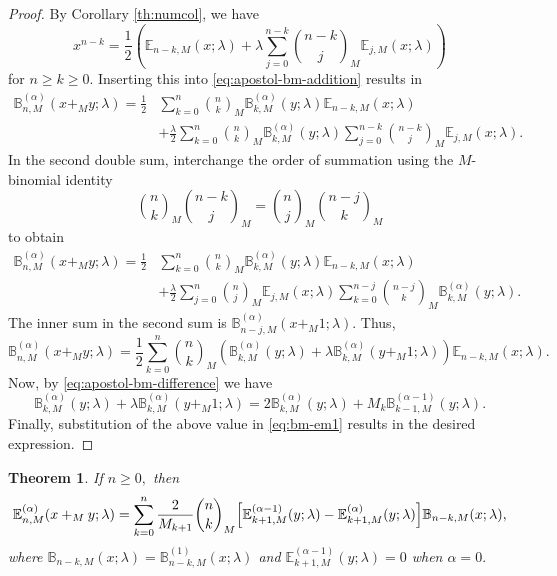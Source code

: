 \documentclass[10pt,a4paper]{amsart}
\newtheorem{theorem}{Theorem}[section]
\numberwithin{equation}{section}
\newcommand{\B}{\mathbb{B}}
\newcommand{\E}{\mathbb{E}}
\begin{document}
\begin{proof}
By Corollary \ref{th:numcol}, we have 
\[
x^{n-k}= \frac{1}{2}\left(\E_{n-k,M}(x;\lambda)+\lambda\sum_{j=0}^{n-k}\binom{n-k}{j}_M\E_{j,M}(x;\lambda)\right)
\]
for $n \geq k \geq 0$. Inserting this into \eqref{eq:apostol-bm-addition} results in
\begin{align*}
\B_{n,M}^{(\alpha)}(x+_M y;\lambda)=
\frac{1}{2}&\sum_{k=0}^n\binom{n}{k}_M\B_{k,M}^{(\alpha)}(y;\lambda)\E_{n-k,M}(x;\lambda)\\
&+\frac{\lambda}{2}\sum_{k=0}^n\binom{n}{k}_M\B_{k,M}^{(\alpha)}(y;\lambda)
\sum_{j=0}^{n-k}\binom{n-k}{j}_M\E_{j,M}(x;\lambda).
\end{align*}
In the second double sum, interchange the order of summation using the $M$-binomial identity
\[
\binom{n}{k}_M\binom{n-k}{j}_M = \binom{n}{j}_M\binom{n-j}{k}_M
\]
to obtain
\begin{align*}
\B_{n,M}^{(\alpha)}(x+_M y;\lambda)=
\frac{1}{2}&\sum_{k=0}^n\binom{n}{k}_M\B_{k,M}^{(\alpha)}(y;\lambda)\E_{n-k,M}(x;\lambda)\\
&+\frac{\lambda}{2}\sum_{j=0}^n\binom{n}{j}_M\E_{j,M}(x;\lambda)
\sum_{k=0}^{n-j}\binom{n-j}{k}_M\B_{k,M}^{(\alpha)}(y;\lambda).
\end{align*}
The inner sum in the second sum is $\B_{n-j,M}^{(\alpha)}(x+_M1;\lambda)$. Thus,
\begin{equation}\label{eq:bm-em1}
\B_{n,M}^{(\alpha)}(x+_M y;\lambda)=
\frac{1}{2}\sum_{k=0}^n\binom{n}{k}_M\left(\B_{k,M}^{(\alpha)}(y;\lambda)+\lambda\B_{k,M}^{(\alpha)}(y+_M1;\lambda)\right)\E_{n-k,M}(x;\lambda).
\end{equation}
Now, by \eqref{eq:apostol-bm-difference} we have
\[
\B_{k,M}^{(\alpha)}(y;\lambda)+\lambda\B_{k,M}^{(\alpha)}(y+_M1;\lambda) = 2\B_{k,M}^{(\alpha)}(y;\lambda)+M_k\B_{k-1,M}^{(\alpha-1)}(y;\lambda).
\]
Finally, substitution of the above value in \eqref{eq:bm-em1} results in the desired expression.
\end{proof}

\begin{theorem}\label{thm:mixed-euler}
If $n \geq 0,$ then
\[
\E_{n,M}^{(\alpha)}(x+_M y;\lambda)
= \sum_{k=0}^n \frac{2}{M_{k+1}}\binom{n}{k}_M
\Bigl[\E_{k+1,M}^{(\alpha-1)}(y;\lambda) - \E_{k+1,M}^{(\alpha)}(y;\lambda)\Bigr]
\B_{n-k,M}(x;\lambda),
\]
where $\B_{n-k,M}(x;\lambda)=\B_{n-k,M}^{(1)}(x;\lambda)$ and $\E_{k+1,M}^{(\alpha-1)}(y;\lambda)=0$ when $\alpha=0.$
\end{theorem}
\end{document}
